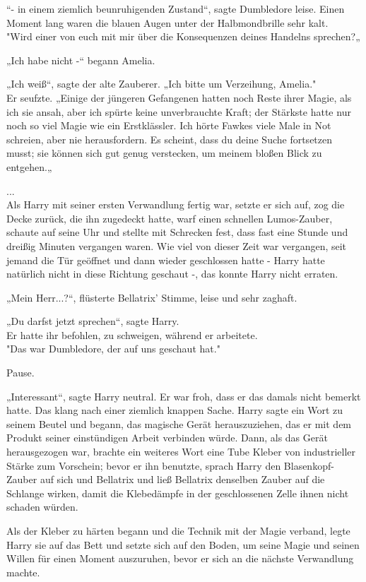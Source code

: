 {“- in einem ziemlich beunruhigenden Zustand“, sagte Dumbledore leise. Einen Moment lang waren die blauen Augen unter der Halbmondbrille sehr kalt.\\ "Wird einer von euch mit mir über die Konsequenzen deines Handelns sprechen?„

„Ich habe nicht -“ begann Amelia.

„Ich weiß“, sagte der alte Zauberer. „Ich bitte um Verzeihung, Amelia."\\ Er seufzte. „Einige der jüngeren Gefangenen hatten noch Reste ihrer Magie, als ich sie ansah, aber ich spürte keine unverbrauchte Kraft; der Stärkste hatte nur noch so viel Magie wie ein Erstklässler. Ich hörte Fawkes viele Male in Not schreien, aber nie herausfordern. Es scheint, dass du deine Suche fortsetzen musst; sie können sich gut genug verstecken, um meinem bloßen Blick zu entgehen.„

...\\ Als Harry mit seiner ersten Verwandlung fertig war, setzte er sich auf, zog die Decke zurück, die ihn zugedeckt hatte, warf einen schnellen Lumos-Zauber, schaute auf seine Uhr und stellte mit Schrecken fest, dass fast eine Stunde und dreißig Minuten vergangen waren. Wie viel von dieser Zeit war vergangen, seit jemand die Tür geöffnet und dann wieder geschlossen hatte - Harry hatte natürlich nicht in diese Richtung geschaut -, das konnte Harry nicht erraten.

„Mein Herr...?“, flüsterte Bellatrix' Stimme, leise und sehr zaghaft.

„Du darfst jetzt sprechen“, sagte Harry.\\ Er hatte ihr befohlen, zu schweigen, während er arbeitete.\\ "Das war Dumbledore, der auf uns geschaut hat."

Pause.

„Interessant“, sagte Harry neutral. Er war froh, dass er das damals nicht bemerkt hatte. Das klang nach einer ziemlich knappen Sache. Harry sagte ein Wort zu seinem Beutel und begann, das magische Gerät herauszuziehen, das er mit dem Produkt seiner einstündigen Arbeit verbinden würde. Dann, als das Gerät herausgezogen war, brachte ein weiteres Wort eine Tube Kleber von industrieller Stärke zum Vorschein; bevor er ihn benutzte, sprach Harry den Blasenkopf-Zauber auf sich und Bellatrix und ließ Bellatrix denselben Zauber auf die Schlange wirken, damit die Klebedämpfe in der geschlossenen Zelle ihnen nicht schaden würden.

Als der Kleber zu härten begann und die Technik mit der Magie verband, legte Harry sie auf das Bett und setzte sich auf den Boden, um seine Magie und seinen Willen für einen Moment auszuruhen, bevor er sich an die nächste Verwandlung machte.

}
